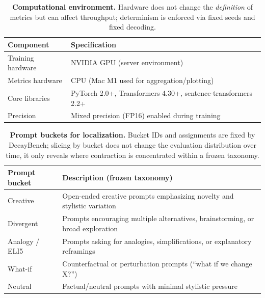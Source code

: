 \documentclass{article}
\theoremstyle{plain}
\theoremstyle{definition}
\theoremstyle{remark}
\begin{document}
\begin{table}[ht!]
\centering
\footnotesize
\setlength{\tabcolsep}{7pt}
\begin{tabular}{p{}p{}}
\toprule
Component & Specification \\
\midrule
Training hardware & NVIDIA GPU (server environment) \\
Metrics hardware & CPU (Mac M1 used for aggregation/plotting) \\
Core libraries & PyTorch 2.0+, Transformers 4.30+, sentence-transformers 2.2+ \\
Precision & Mixed precision (FP16) enabled during training \\
\bottomrule
\end{tabular}
\caption{\textbf{ Computational environment.} Hardware does not change the \emph{definition} of metrics but can affect throughput; determinism is enforced via fixed seeds and fixed decoding.}
\label{tab:repro_env}
\end{table}




\begin{table}[ht!]
\centering
\footnotesize
\setlength{\tabcolsep}{7pt}
\begin{tabular}{p{}p{}}
\toprule
Prompt bucket & Description (frozen taxonomy) \\
\midrule
Creative & Open-ended creative prompts emphasizing novelty and stylistic variation \\
Divergent & Prompts encouraging multiple alternatives, brainstorming, or broad exploration \\
Analogy / ELI5 & Prompts asking for analogies, simplifications, or explanatory reframings \\
What-if & Counterfactual or perturbation prompts (``what if we change X?'') \\
Neutral & Factual/neutral prompts with minimal stylistic pressure \\
\bottomrule
\end{tabular}
\caption{\textbf{ Prompt buckets for localization.} Bucket IDs and assignments are fixed by DecayBench; slicing by bucket does not change the evaluation distribution over time, it only reveals where contraction is concentrated within a frozen taxonomy.}
\label{tab:repro_buckets}
\end{table}
\end{document}
